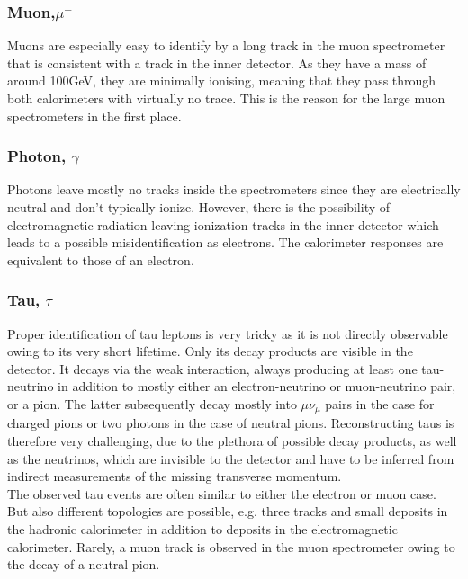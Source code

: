 \documentclass[twoside,        %
               BCOR12mm,       %
               ngerman,english, %
               fleqn,headsepline=false,footsepline=false
              ]{Vorlage/MFPREPORT}
\begin{document}
\subsubsection{Muon,$ \mu^-$}
Muons are especially easy to identify by a long track in the muon spectrometer
that is consistent with a track in the inner detector. As they have a mass of
around 100\;GeV, they are minimally ionising, meaning that they pass through
both calorimeters with virtually no trace. This is the reason for the large
muon spectrometers in the first place.

\subsubsection{Photon, $\gamma$}
Photons leave mostly no tracks inside the spectrometers since they are electrically
neutral and don't typically ionize. However, there is the possibility of
electromagnetic radiation leaving ionization tracks in the inner detector which
leads to a possible misidentification as electrons. The calorimeter responses
are equivalent to those of an electron.

\subsubsection{Tau, $\tau$}
Proper identification of tau leptons is very tricky as it is not directly
observable owing to its very short lifetime. Only its decay products are
visible in the detector. It decays via the weak interaction, always producing
at least one tau-neutrino in addition to mostly either an electron-neutrino or
muon-neutrino pair, or a pion. The latter subsequently decay
mostly into $\mu\nu_\mu$ pairs in the case for charged pions or two photons in
the case of neutral pions.
Reconstructing taus is therefore very challenging, due to the plethora of
possible decay products, as well as the neutrinos, which are invisible to the
detector and have to be inferred from indirect measurements of the missing
transverse momentum.\\
The observed tau events are often similar to either the electron or muon case.
But also different topologies are possible, e.g. three tracks and small
deposits in the hadronic calorimeter in addition to deposits in the
electromagnetic calorimeter. Rarely, a muon track is observed in the muon
spectrometer owing to the decay of a neutral pion.
\end{document}
